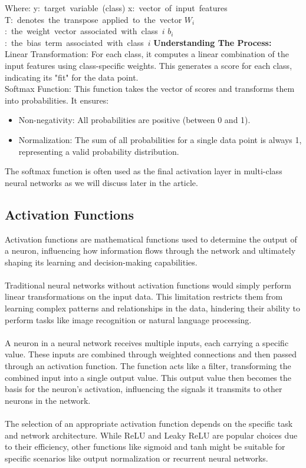 \documentclass{article}
\begin{document}
\hbox{Where:}
\hbox{y: target variable (class)}
\hbox{x: vector of input features}
\hbox{T: denotes the transpose applied to the vector}
\hbox{${W_i}$: the weight vector associated with class ${i}$}
\hbox{${b_i}$: the bias term associated with class ${i}$}  \hfill\newline
\textbf{Understanding The Process:}\hfill\newline\\
Linear Transformation: For each class, it computes a linear combination of the input features using class-specific weights. This generates a score for each class, indicating its "fit" for the data point.\hfill\newline\\
Softmax Function: This function takes the vector of scores and transforms them into probabilities. It ensures:
\begin{itemize}
\item Non-negativity: All probabilities are positive (between 0 and 1).
\end{itemize}
\begin{itemize}
\item Normalization: The sum of all probabilities for a single data point is always 1, representing a valid probability distribution.
\end{itemize}
The softmax function is often used as the final activation layer in multi-class neural networks as we will discuss later in the article.

\subsection{Activation Functions}
Activation functions are mathematical functions used to determine the output of a neuron, influencing how information flows through the network and ultimately shaping its learning and decision-making capabilities.\\\\
Traditional neural networks without activation functions would simply perform linear transformations on the input data. This limitation restricts them from learning complex patterns and relationships in the data, hindering their ability to perform tasks like image recognition or natural language processing.\\\\
A neuron in a neural network receives multiple inputs, each carrying a specific value. These inputs are combined through weighted connections and then passed through an activation function. The function acts like a filter, transforming the combined input into a single output value. This output value then becomes the basis for the neuron's activation, influencing the signals it transmits to other neurons in the network.\\\\
The selection of an appropriate activation function depends on the specific task and network architecture. While ReLU and Leaky ReLU are popular choices due to their efficiency, other functions like sigmoid and tanh might be suitable for specific scenarios like output normalization or recurrent neural networks.\newline
\end{document}
